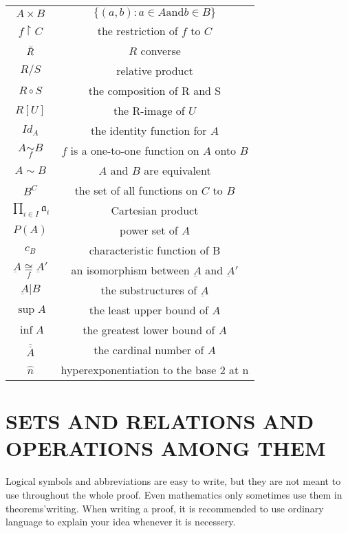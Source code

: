 \documentclass[a4paper,11pt]{article}%
\theoremstyle{remark}
\theoremstyle{definition}
\theoremstyle{definition}
\theoremstyle{plain}
\theoremstyle{definition}
\begin{document}
\begin{longtable}{cc}
    $A\times B$& $\{(a,b):a\in A \text{and} b\in B\}$\\
    $f\upharpoonright C$& the restriction of $f$ to $C$\\
    $\Breve{R}$& $R$ converse\\
    $R/S$&relative product\\
    $R\circ S$&the composition of R and S\\
    $R[U]$&the R-image of $U$\\
    $Id_A$&the identity function for $A$\\
    $A\underset{f}{\sim} B$&$f$ is a one-to-one function on $A$ onto $B$\\
    $A \sim B$& $A$ and $B$ are equivalent\\
    $B^C$& the set of all functions on $C$ to $B$\\
    $\prod_{i\in I}\mathfrak{a}_i$&Cartesian product\\
    $P(A)$&power set of $A$\\ 
    $c_B$&characteristic function of B\\
    $\underbar{A}\underset{f}{\cong }\underbar{A}'$&an isomorphism between $\underbar{A}$ and $\underbar{A}'$\\
    $\underbar{A}|B$& the substructures of $\underbar{A}$\\
    $\sup A$& the least upper bound of $A$\\
    $\inf A$& the greatest lower bound of $A$\\ 
    $\bar{\bar{A}}$& the cardinal number of $A$\\
    $\hat{n} $& hyperexponentiation to the base 2 at n\\
\end{longtable}
\newpage
\section{SETS AND RELATIONS AND OPERATIONS AMONG THEM}
    Logical symbols and abbreviations are easy to write, but 
they are not meant to use throughout the whole proof. Even mathematics
only sometimes use them in theorems'writing. When writing a proof,
it is recommended to use ordinary language to explain your idea whenever it is
necessery.
\end{document}
